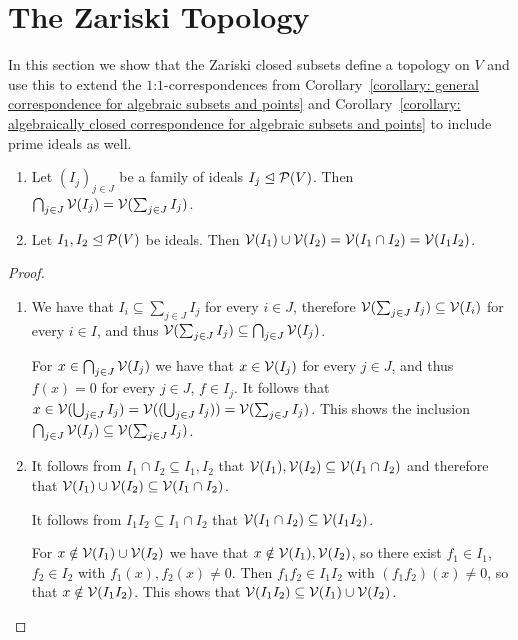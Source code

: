 \section{The Zariski Topology}


\begin{fluff}
  In this section we show that the Zariski closed subsets define a topology on $V$ and use this to extend the $1$:$1$-correspondences from Corollary~\ref{corollary: general correspondence for algebraic subsets and points} and Corollary~\ref{corollary: algebraically closed correspondence for algebraic subsets and points} to include prime ideals as well.
\end{fluff}


\begin{lemma}
  \label{lemma: intersections and unions of Zariski closed sets}
  \leavevmode
  \begin{enumerate}
    \item
      Let $(I_j)_{j \in J}$ be a family of ideals $I_j \trianglelefteq \mathcal{P}(V)$.
      Then $\bigcap_{j \in J} \mathcal{V}(I_j) = \mathcal{V}( \sum_{j \in J} I_j )$.
    \item
      Let $I_1, I_2 \trianglelefteq \mathcal{P}(V)$ be ideals.
      Then $\mathcal{V}(I_1) \cup \mathcal{V}(I_2) = \mathcal{V}(I_1 \cap I_2) = \mathcal{V}(I_1 I_2)$.
  \end{enumerate}
\end{lemma}
\begin{proof}
  \leavevmode
  \begin{enumerate}
    \item
      We have that $I_i \subseteq \sum_{j \in J} I_j$ for every $i \in J$, therefore $\mathcal{V}( \sum_{j \in J} I_j ) \subseteq \mathcal{V}(I_i)$ for every $i \in I$, and thus $\mathcal{V}( \sum_{j \in J} I_j ) \subseteq \bigcap_{j \in J} \mathcal{V}(I_j)$.
      
      For $x \in \bigcap_{j \in J} \mathcal{V}(I_j)$ we have that $x \in \mathcal{V}(I_j)$ for every $j \in J$, and thus $f(x) = 0$ for every $j \in J$, $f \in I_j$.
      It follows that $x \in \mathcal{V}( \bigcup_{j \in J} I_j ) = \mathcal{V}( (\bigcup_{j \in J} I_j) ) = \mathcal{V}( \sum_{j \in J} I_j )$.
      This shows the inclusion $\bigcap_{j \in J} \mathcal{V}(I_j) \subseteq \mathcal{V}( \sum_{j \in J} I_j )$.
    \item
      It follows from $I_1 \cap I_2 \subseteq I_1, I_2$ that $\mathcal{V}(I_1), \mathcal{V}(I_2) \subseteq \mathcal{V}(I_1 \cap I_2)$ and therefore that $\mathcal{V}(I_1) \cup \mathcal{V}(I_2) \subseteq \mathcal{V}(I_1 \cap I_2)$.
      
      It follows from $I_1 I_2 \subseteq I_1 \cap I_2$ that $\mathcal{V}(I_1 \cap I_2) \subseteq \mathcal{V}(I_1 I_2)$.
      
      For $x \notin \mathcal{V}(I_1) \cup \mathcal{V}(I_2)$ we have that $x \notin \mathcal{V}(I_1), \mathcal{V}(I_2)$, so there exist $f_1 \in I_1$, $f_2 \in I_2$ with $f_1(x), f_2(x) \neq 0$.
      Then $f_1 f_2 \in I_1 I_2$ with $(f_1 f_2)(x) \neq 0$, so that $x \notin \mathcal{V}(I_1 I_2)$.
      This shows that $\mathcal{V}(I_1 I_2) \subseteq \mathcal{V}(I_1) \cup \mathcal{V}(I_2)$.
    \qedhere
  \end{enumerate}
\end{proof}


